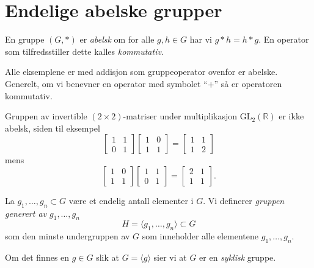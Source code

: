 \section{Endelige abelske grupper}

\begin{definition}
    En gruppe $(G, \ast)$ er \textit{abelsk} om
    for alle $g,h\in G$ har vi $g\ast h = h\ast g$.
    En operator som tilfredsstiller dette kalles \textit{kommutativ}.
\end{definition}

\begin{example}
    Alle eksemplene er med addisjon som gruppeoperator ovenfor er abelske.
    Generelt, om vi benevner en operator med symbolet ``$+$'' så er operatoren
    kommutativ.
\end{example}

\begin{example}
    Gruppen av invertible $(2\times 2)$-matriser under multiplikasjon
    $\mathrm{GL}_2(\mathbb R)$
    er ikke abelsk, siden til eksempel
    \[
        \begin{bmatrix}
            1 & 1\\
            0 & 1
        \end{bmatrix}
        \begin{bmatrix}
            1 & 0\\
            1 & 1
        \end{bmatrix}
        =
        \begin{bmatrix}
            1 & 1\\
            1 & 2
        \end{bmatrix}
    \]
    mens
    \[
        \begin{bmatrix}
            1 & 0\\
            1 & 1
        \end{bmatrix}
        \begin{bmatrix}
            1 & 1\\
            0 & 1
        \end{bmatrix}
        =
        \begin{bmatrix}
            2 & 1\\
            1 & 1
        \end{bmatrix}.
    \]
\end{example}

\begin{definition}
    La $g_1,\dots, g_n\subset G$ være et endelig antall elementer i $G$.
    Vi definerer \textit{gruppen generert av $g_1,\dots, g_n$}
    \[
        H = \langle g_1,\dots,g_n\rangle \subset G
    \]
    som den minste undergruppen av $G$ som inneholder alle elementene $g_1,\dots,g_n$.

    Om det finnes en $g\in G$ slik at $G = \langle g\rangle$ sier vi at $G$
    er en \textit{syklisk} gruppe.
\end{definition}

